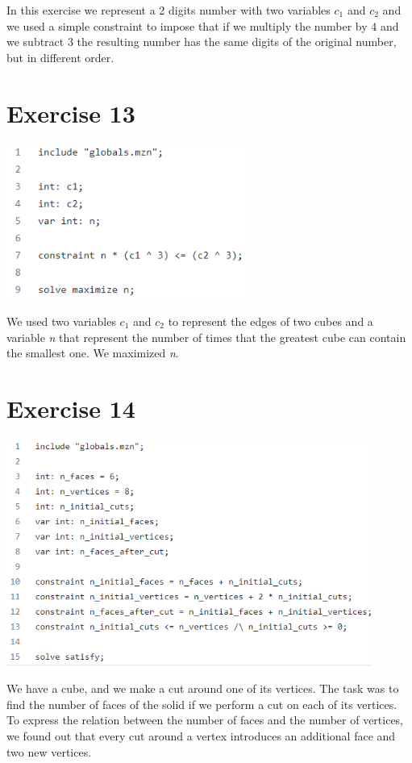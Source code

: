 \documentclass{article}
\begin{document}
In this exercise we represent a 2 digits number with two variables \textit{$c_1$}
and  \textit{$c_2$} and we used a simple constraint to impose that if we multiply the number by 4 and we subtract 3 the resulting number has the same digits of the original number, but in different order.

\section{Exercise 13}
\vspace{0.2cm}
\includegraphics[width=8cm]{img/Es13.png}
\vspace{0.2cm}

We used two variables \textit{$c_1$} and \textit{$c_2$} to represent the edges of two cubes and a variable \textit{n} that represent the number of times that the greatest cube can contain the smallest one. We maximized \textit{n}.

\section{Exercise 14}
\vspace{0.2cm}
\includegraphics[width=12cm]{img/Es14.png}
\vspace{0.2cm}

We have a cube, and we make a cut around one of its vertices. The task was to find the number of faces of the solid if we perform a cut on 
each of its vertices. 
To express the relation between the number of faces and the number of vertices, we found out that every cut around a vertex introduces an additional
face and two new vertices.
\end{document}
